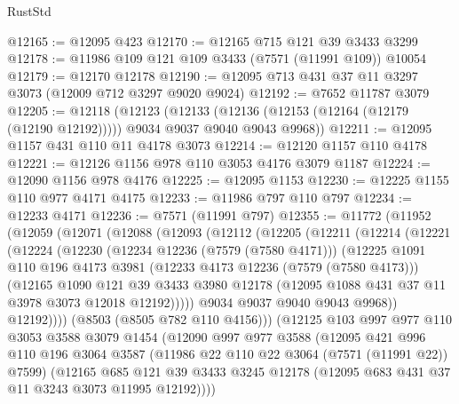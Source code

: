 \begin{lexlean}{RustStd}
\begin{coremodule}
{\begin{coremodule}
{{{{{{{{{{{{{{{{{{{{{{{{{{{{{{{{@12165 := @12095 @423
@12170 := @12165 @715 @121 @39 @3433 @3299
@12178 := @11986 @109 @121 @109 @3433 (@7571 (@11991 @109)) @10054
@12179 := @12170 @12178
@12190 := @12095 @713 @431 @37 @11 @3297 @3073 (@12009 @712 @3297 @9020 @9024)
@12192 := @7652 @11787 @3079
@12205 := @12118
    (@12123
      (@12133 (@12136 (@12153 (@12164 (@12179 (@12190 @12192))))) @9034 @9037 @9040 @9043 @9968))
@12211 := @12095 @1157 @431 @110 @11 @4178 @3073
@12214 := @12120 @1157 @110 @4178
@12221 := @12126 @1156 @978 @110 @3053 @4176 @3079 @1187
@12224 := @12090 @1156 @978 @4176
@12225 := @12095 @1153
@12230 := @12225 @1155 @110 @977 @4171 @4175
@12233 := @11986 @797 @110 @797
@12234 := @12233 @4171
@12236 := @7571 (@11991 @797)
@12355 := @11772
    (@11952
      (@12059
        (@12071
          (@12088
            (@12093
              (@12112
                (@12205
                  (@12211
                    (@12214
                      (@12221
                        (@12224
                          (@12230
                            (@12234 @12236 (@7579 (@7580 @4171)))
                            (@12225
                              @1091
                              @110
                              @196
                              @4173
                              @3981
                              (@12233 @4173 @12236 (@7579 (@7580 @4173)))
                              (@12165
                                @1090
                                @121
                                @39
                                @3433
                                @3980
                                @12178
                                (@12095 @1088 @431 @37 @11 @3978 @3073 @12018 @12192)))))
                        @9034
                        @9037
                        @9040
                        @9043
                        @9968))
                    @12192))))
            (@8503 (@8505 @782 @110 @4156)))
          (@12125
            @103
            @997
            @977
            @110
            @3053
            @3588
            @3079
            @1454
            (@12090
              @997
              @977
              @3588
              (@12095
                @421
                @996
                @110
                @196
                @3064
                @3587
                (@11986 @22 @110 @22 @3064 (@7571 (@11991 @22)) @7599)
                (@12165
                  @685
                  @121
                  @39
                  @3433
                  @3245
                  @12178
                  (@12095 @683 @431 @37 @11 @3243 @3073 @11995 @12192))))
}}}}}}}}}}}}}}}}}}}}}}}}}}}}}}}}
\end{coremodule}}
\end{coremodule}
\end{lexlean}
